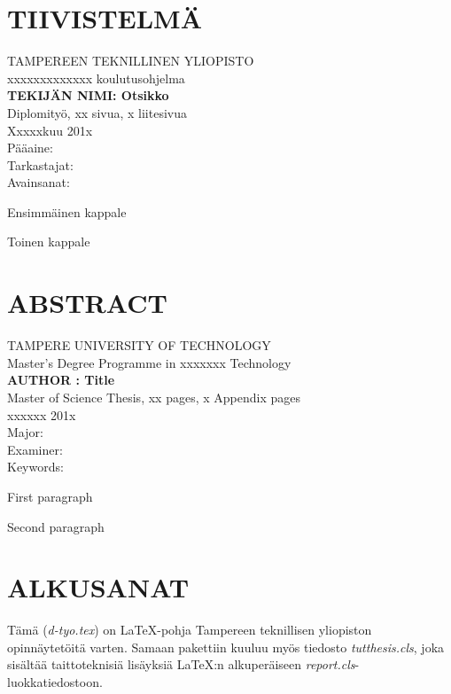 \documentclass[12pt,a4paper,finnish]{vendor/tutthesis}
\begin{document}
\setcounter{page}{1} %

\chapter*{TIIVISTELMÄ}
\begin{spacing}{1.0}
\textsf{TAMPEREEN TEKNILLINEN YLIOPISTO}\\
\textsf{xxxxxxxxxxxxx koulutusohjelma}\\
{\bf \textsf{TEKIJÄN NIMI: Otsikko}}\\
\textsf{Diplomityö, xx sivua, x liitesivua}\\
\textsf{Xxxxxkuu 201x}\\
\textsf{Pääaine: }\\
\textsf{Tarkastajat: }\\
\textsf{Avainsanat: }\\
\end{spacing}

\noindent
Ensimmäinen kappale

\noindent
Toinen kappale
\newpage
\chapter*{ABSTRACT}
\begin{spacing}{1.0}
\textsf{TAMPERE UNIVERSITY OF TECHNOLOGY}\\
\textsf{Master's Degree Programme in xxxxxxx Technology}\\
{\bf \textsf{AUTHOR : Title}}\\
\textsf{Master of Science Thesis, xx pages, x Appendix pages}\\
\textsf{xxxxxx 201x}\\
\textsf{Major: }\\
\textsf{Examiner: }\\
\textsf{Keywords: }\\
\end{spacing}

\noindent
First paragraph

\noindent
Second paragraph

\newpage

\chapter*{ALKUSANAT}
\noindent Tämä (\textit{d-tyo.tex}) on \LaTeX-pohja Tampereen teknillisen
yliopiston opinnäytetöitä varten. Samaan pakettiin kuuluu myös
tiedosto \mbox{\textit{tutthesis.cls}}, joka sisältää taittoteknisiä
lisäyksiä \LaTeX:n alkuperäiseen \textit{report.cls}-luokkatiedostoon.
\end{document}
